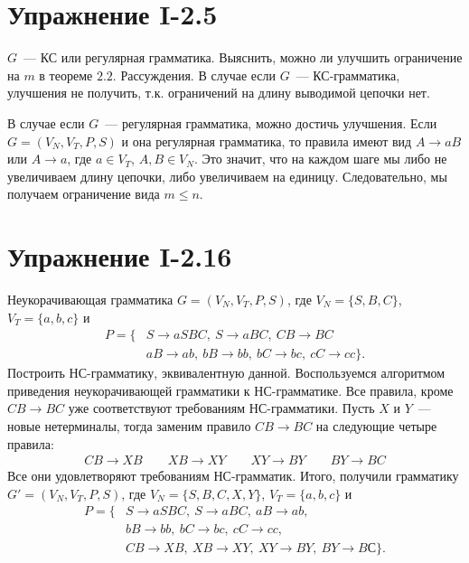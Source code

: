 \documentclass[12pt, oneside]{memoir}
\begin{document}
\section*{Упражнение I-2.5}
\begin{solution}
    {$G$~--- КС или регулярная грамматика.}
    {Выяснить, можно ли улучшить ограничение на $m$ в теореме $2.2$.}
    {Рассуждения.}
    В случае если $G$~--- КС-грамматика, улучшения не получить, т.к. ограничений на длину выводимой цепочки нет.

    В случае если $G$~--- регулярная грамматика, можно достичь улучшения.
    Если $G = (V_N, V_T, P, S)$ и она регулярная грамматика, то правила имеют вид $A \to aB$ или $A \to a$, где $a \in V_T$, $A,B \in V_N$.
    Это значит, что на каждом шаге мы либо не увеличиваем длину цепочки, либо увеличиваем на единицу.
    Следовательно, мы получаем ограничение вида $m \le n$.
\end{solution}

\section*{Упражнение I-2.16}
\begin{solution}
    {Неукорачивающая грамматика $G = (V_N, V_T, P, S)$, где $V_N = \{S, B, C\}$, $V_T = \{a,b,c\}$ и
        \begin{align*}
            P = \{ & S \to aSBC,\ S \to aBC,\ CB \to BC               \\
                   & aB \to ab,\ bB \to bb,\ bC \to bc,\ cC \to cc\}.
        \end{align*}}
    {Построить НС-грамматику, эквивалентную данной.}
    {Воспользуемся алгоритмом приведения неукорачивающей грамматики к НС-грамматике.}
    Все правила, кроме $CB \to BC$ уже соответствуют требованиям НС-грамматики.
    Пусть $X$ и $Y$~--- новые нетерминалы, тогда заменим правило $CB \to BC$ на следующие четыре правила:
    \begin{gather*}
        CB \to XB \qquad XB \to XY \qquad XY \to BY \qquad BY \to BC
    \end{gather*}
    Все они удовлетворяют требованиям НС-грамматик.
    Итого, получили грамматику $G' = (V_N, V_T, P, S)$, где $V_N = \{S, B, C, X, Y\}$, $V_T = \{a,b,c\}$ и
    \begin{align*}
        P = \{ & S \to aSBC,\ S \to aBC,\ aB \to ab,                \\
               & bB \to bb,\ bC \to bc,\ cC \to cc,                 \\
               & CB \to XB,\ XB \to XY, \ XY \to BY, \ BY \to BС\}.
    \end{align*}
\end{solution}
\end{document}
